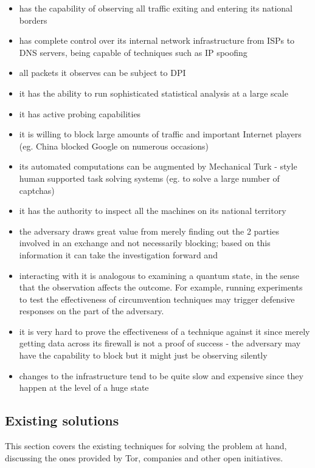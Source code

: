 \documentclass[11pt]{article} %
\begin{document}
\begin{itemize}
\item has the capability of observing all traffic exiting and entering its national borders
\item has complete control over its internal network infrastructure from ISPs to DNS servers, being capable  of techniques such as IP spoofing
\item all packets it observes can be subject to DPI 
\item it has the ability to run sophisticated statistical analysis at a large scale
\item it has active probing capabilities 
\item it is willing to block large amounts of traffic and important Internet players (eg. China blocked Google on numerous occasions)
\item its automated computations can be augmented by Mechanical Turk - style human supported task solving systems (eg. to solve a large number of captchas)
\item it has the authority to inspect all the machines on its national territory
\item the adversary draws great value from merely finding out the 2 parties involved in an exchange and not necessarily blocking; based on this information it can take the investigation forward and 
\item interacting with it is analogous to examining a quantum state, in the sense that the observation affects the outcome. For example, running experiments to test the effectiveness of circumvention techniques may trigger defensive responses on the part of the adversary.
\item it is very hard to prove the effectiveness of a technique against it since merely getting data across its firewall is not a proof of success - the adversary may have the capability to block but it might just be observing silently
\item changes to the infrastructure tend to be quite slow and expensive since they happen at the level of a huge state
\end{itemize}

\subsection{Existing solutions}

This section covers the existing techniques for solving the problem at hand, discussing the ones provided by Tor, companies and other open initiatives.
 
\end{document}
